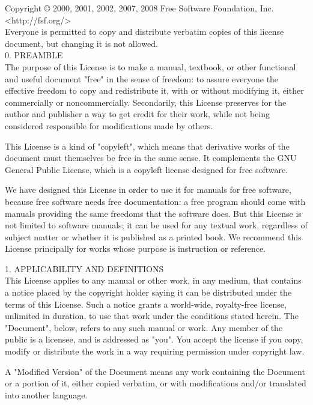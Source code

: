 \documentclass[oneside,12pt]{memoir} %
\begin{document}
Copyright © 2000, 2001, 2002, 2007, 2008 Free Software Foundation, Inc. <http://fsf.org/>\\

Everyone is permitted to copy and distribute verbatim copies of this license document, but changing it is not allowed.\\

0. PREAMBLE\\

The purpose of this License is to make a manual, textbook, or other functional and useful document "free" in the sense of freedom: to assure everyone the effective freedom to copy and redistribute it, with or without modifying it, either commercially or noncommercially. Secondarily, this License preserves for the author and publisher a way to get credit for their work, while not being considered responsible for modifications made by others.

This License is a kind of "copyleft", which means that derivative works of the document must themselves be free in the same sense. It complements the GNU General Public License, which is a copyleft license designed for free software.

We have designed this License in order to use it for manuals for free software, because free software needs free documentation: a free program should come with manuals providing the same freedoms that the software does. But this License is not limited to software manuals; it can be used for any textual work, regardless of subject matter or whether it is published as a printed book. We recommend this License principally for works whose purpose is instruction or reference.

1. APPLICABILITY AND DEFINITIONS\\

This License applies to any manual or other work, in any medium, that contains a notice placed by the copyright holder saying it can be distributed under the terms of this License. Such a notice grants a world-wide, royalty-free license, unlimited in duration, to use that work under the conditions stated herein. The "Document", below, refers to any such manual or work. Any member of the public is a licensee, and is addressed as "you". You accept the license if you copy, modify or distribute the work in a way requiring permission under copyright law.

A "Modified Version" of the Document means any work containing the Document or a portion of it, either copied verbatim, or with modifications and/or translated into another language.
\end{document}
